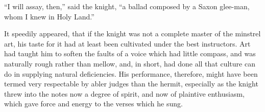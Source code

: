 ``I will assay, then,'' said the knight, ``a ballad composed by a Saxon
glee-man, whom I knew in Holy Land.''

It speedily appeared, that if the knight was not a complete master of
the minstrel art, his taste for it had at least been cultivated under
the best instructors. Art had taught him to soften the faults of a voice
which had little compass, and was naturally rough rather than mellow,
and, in short, had done all that culture can do in supplying natural
deficiencies. His performance, therefore, might have been termed very
respectable by abler judges than the hermit, especially as the knight
threw into the notes now a degree of spirit, and now of plaintive
enthusiasm, which gave force and energy to the verses which he sung.

\begin{verse}


\end{verse}
